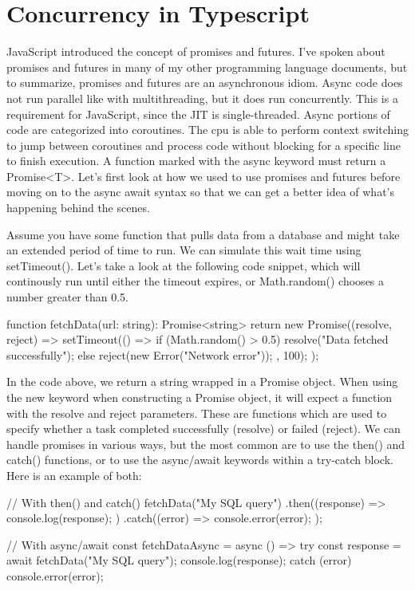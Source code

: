 \documentclass{article}
\begin{document}
\section{Concurrency in Typescript}

JavaScript introduced the concept of promises and futures. I've spoken about promises and futures in many of my
other programming language documents, but to summarize, promises and futures are an asynchronous idiom. Async
code does not run parallel like with multithreading, but it does run concurrently. This is a requirement for
JavaScript, since the JIT is single-threaded. Async portions of code are categorized into coroutines. The cpu is
able to perform context switching to jump between coroutines and process code without blocking for a specific
line to finish execution. A function marked with the async keyword must return a Promise<T>. Let's first look
at how we used to use promises and futures before moving on to the async await syntax so that we can get a
better idea of what's happening behind the scenes.

Assume you have some function that pulls data from a database and might take an extended period of time to run.
We can simulate this wait time using setTimeout(). Let's take a look at the following code snippet, which will
continously run until either the timeout expires, or Math.random() chooses a number greater than 0.5.

\begin{tslst}

function fetchData(url: string): Promise<string> {
    return new Promise((resolve, reject) => {
        setTimeout(() => {
            if (Math.random() > 0.5) {
                resolve("Data fetched successfully");
            } else {
                reject(new Error("Network error"));
            }
        }, 100);
    });
}

\end{tslst}

In the code above, we return a string wrapped in a Promise object. When using the new keyword when constructing
a Promise object, it will expect a function with the resolve and reject parameters. These are functions which
are used to specify whether a task completed successfully (resolve) or failed (reject). We can handle promises
in various ways, but the most common are to use the then() and catch() functions, or to use the async/await
keywords within a try-catch block. Here is an example of both:

\begin{tslst}

// With then() and catch()
fetchData("My SQL query")
    .then((response) => {
        console.log(response);
    })
    .catch((error) => {
        console.error(error);
    });

// With async/await
const fetchDataAsync = async () => {
    try {
        const response = await fetchData("My SQL query");
        console.log(response);
    } catch (error) {
        console.error(error);
    }
}

\end{tslst}
\end{document}
